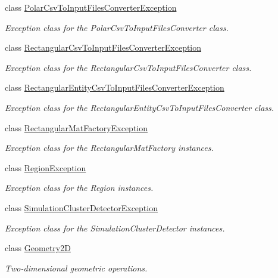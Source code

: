 \begin{DoxyCompactItemize}
class \hyperlink{classmultiscale_1_1PolarCsvToInputFilesConverterException}{Polar\-Csv\-To\-Input\-Files\-Converter\-Exception}
\begin{DoxyCompactList}\small\item\em Exception class for the Polar\-Csv\-To\-Input\-Files\-Converter class. \end{DoxyCompactList}\item 
class \hyperlink{classmultiscale_1_1RectangularCsvToInputFilesConverterException}{Rectangular\-Csv\-To\-Input\-Files\-Converter\-Exception}
\begin{DoxyCompactList}\small\item\em Exception class for the Rectangular\-Csv\-To\-Input\-Files\-Converter class. \end{DoxyCompactList}\item 
class \hyperlink{classmultiscale_1_1RectangularEntityCsvToInputFilesConverterException}{Rectangular\-Entity\-Csv\-To\-Input\-Files\-Converter\-Exception}
\begin{DoxyCompactList}\small\item\em Exception class for the Rectangular\-Entity\-Csv\-To\-Input\-Files\-Converter class. \end{DoxyCompactList}\item 
class \hyperlink{classmultiscale_1_1RectangularMatFactoryException}{Rectangular\-Mat\-Factory\-Exception}
\begin{DoxyCompactList}\small\item\em Exception class for the Rectangular\-Mat\-Factory instances. \end{DoxyCompactList}\item 
class \hyperlink{classmultiscale_1_1RegionException}{Region\-Exception}
\begin{DoxyCompactList}\small\item\em Exception class for the Region instances. \end{DoxyCompactList}\item 
class \hyperlink{classmultiscale_1_1SimulationClusterDetectorException}{Simulation\-Cluster\-Detector\-Exception}
\begin{DoxyCompactList}\small\item\em Exception class for the Simulation\-Cluster\-Detector instances. \end{DoxyCompactList}\item 
class \hyperlink{classmultiscale_1_1Geometry2D}{Geometry2\-D}
\begin{DoxyCompactList}\small\item\em Two-\/dimensional geometric operations. \end{DoxyCompactList}\item 

\end{DoxyCompactItemize}
